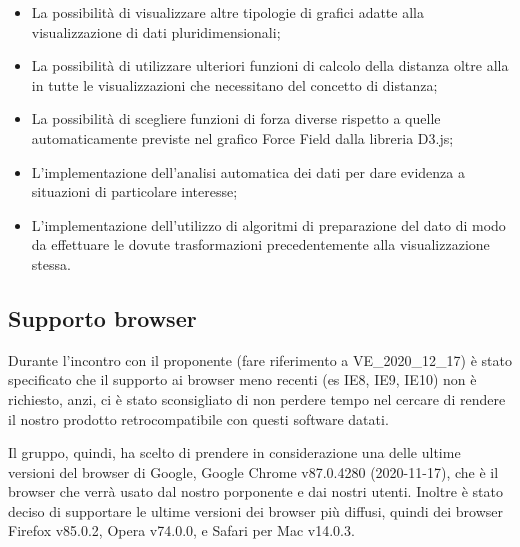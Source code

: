 \documentclass[../analisi-dei-requisiti.tex]{subfiles}
\begin{document}
\begin{itemize}
    \item La possibilità di visualizzare altre tipologie di grafici adatte alla visualizzazione di dati
    pluridimensionali;
    \item La possibilità di utilizzare ulteriori funzioni di calcolo della distanza oltre alla
     in tutte le visualizzazioni che necessitano del concetto di distanza;
    \item La possibilità di scegliere funzioni di forza diverse rispetto a quelle automaticamente previste nel grafico
    Force Field dalla libreria D3.js;
    \item L'implementazione dell'analisi automatica dei dati per dare evidenza a situazioni di particolare interesse;
    \item L'implementazione dell'utilizzo di algoritmi di preparazione del dato di modo da effettuare le dovute
    trasformazioni precedentemente alla visualizzazione stessa.
\end{itemize}

\subsection{Supporto browser}
\label{sub:supporto_browser}

Durante l'incontro con il proponente (fare riferimento a VE\_2020\_12\_17) è stato specificato che il supporto ai browser meno recenti (es IE8, IE9, IE10) non è richiesto, anzi, ci è stato sconsigliato di non perdere tempo nel cercare di rendere il nostro prodotto retrocompatibile con questi software datati.

Il gruppo, quindi, ha scelto di prendere in considerazione una delle ultime versioni del browser di Google, Google Chrome v87.0.4280 (2020-11-17), che è il browser che verrà usato dal nostro porponente e dai nostri utenti. 
Inoltre è stato deciso di supportare le ultime versioni dei browser più diffusi, quindi dei browser Firefox v85.0.2, Opera v74.0.0, e Safari per Mac v14.0.3.
\end{document}
